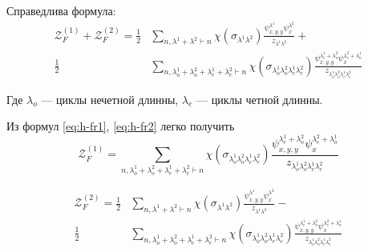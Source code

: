 \begin{statement}
Справедлива формула:
\begin{equation}
\label{eq:h-fr2}
\begin{split}
\mathcal Z_F^{(1)} + \mathcal Z_F^{(2)} = 
\frac{1}{2}&
\sum_{n, \lambda^1 + \lambda^2 \vdash n}\chi(\sigma_{\lambda^1 \lambda^2})
\frac{\psi_{x, y, y}^{\lambda^1} \psi_{x}^{\lambda^2}}{z_{\lambda^1 \lambda^2}}
+ \\
\frac{1}{2}&
\sum_{n, \lambda_o^1 + \lambda_o^2 + \lambda_e^1 + \lambda_e^2 \vdash
n}\chi(\sigma_{\lambda_o^1 \lambda_o^2 \lambda_e^1 \lambda_e^2})
\frac{\psi_{x, y, y}^{\lambda_e^1 + \lambda_o^2} \psi_{x}^{\lambda_e^2 + 
\lambda_o^1}}{z_{\lambda_o^1 \lambda_o^2 \lambda_e^1 \lambda_e^2}}
\end{split}
\end{equation}
\end{statement}
Где $\lambda_o$ --- циклы нечетной длинны, $\lambda_e$ ---
циклы четной длинны.

Из формул \ref{eq:h-fr1}, \ref{eq:h-fr2} легко получить
\begin{equation}
\mathcal Z_F^{(1)} = 
\sum_{n, \lambda_o^1 + \lambda_o^2 + \lambda_e^1 + \lambda_e^2 \vdash
n}\chi(\sigma_{\lambda_o^1 \lambda_o^2 \lambda_e^1 \lambda_e^2})
\frac{\psi_{x, y, y}^{\lambda_e^1 + \lambda_o^2} \psi_{x}^{\lambda_e^2 + 
\lambda_o^1}}{z_{\lambda_o^1 \lambda_o^2 \lambda_e^1 \lambda_e^2}}
\end{equation}

\begin{equation}
\begin{split}
\mathcal Z_F^{(2)} = 
\frac{1}{2}&
\sum_{n, \lambda^1 + \lambda^2 \vdash n}\chi(\sigma_{\lambda^1 \lambda^2})
\frac{\psi_{x, y, y}^{\lambda^1} \psi_{x}^{\lambda^2}}{z_{\lambda^1 \lambda^2}}
- \\
\frac{1}{2}&
\sum_{n, \lambda_o^1 + \lambda_o^2 + \lambda_e^1 + \lambda_e^2 \vdash
n}\chi(\sigma_{\lambda_o^1 \lambda_o^2 \lambda_e^1 \lambda_e^2})
\frac{\psi_{x, y, y}^{\lambda_e^1 + \lambda_o^2} \psi_{x}^{\lambda_e^2 + 
\lambda_o^1}}{z_{\lambda_o^1 \lambda_o^2 \lambda_e^1 \lambda_e^2}}
\end{split}
\end{equation}

